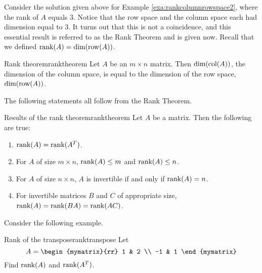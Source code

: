 Consider the solution given above for Example
\ref{exa:rankcolumnrowspace2}, where the rank of $A$ equals
$3$. Notice that the row space and the column space each had dimension
equal to $3$. It turns out that this is not a coincidence, and this
essential result is referred to as the Rank Theorem and is given
now. Recall that we defined $\mbox{rank}(A) = \mbox{dim}(\mbox{row}(A))$. 

\begin{theorem}{Rank theorem}{ranktheorem}
Let $A$ be an $m \times n$ matrix. Then $\mbox{dim}(\mbox{col} (A))$, the dimension of the column space, is equal to the dimension of the row space, $\mbox{dim}(\mbox{row}(A))$.
\end{theorem}

The following statements all follow from the Rank Theorem.

\begin{corollary}{Results of the rank theorem}{ranktheorem}
Let $A$ be a matrix. Then the following are true:
\begin{enumerate}
\item
 $\mbox{rank}(A) = \mbox{rank}(A^T)$.
\item
For $A$ of size $m \times n$, $\mbox{rank}(A) \leq m$ and $\mbox{rank}(A) \leq n$.
\item
For $A$ of size $n \times n$,  $A$ is invertible if and only if $\mbox{rank}(A) = n$.
\item
For invertible matrices $B$ and $C$ of appropriate size, 
$\mbox{rank}(A) = \mbox{rank}(BA) = \mbox{rank}(AC)$. 
\end{enumerate}
\end{corollary}

Consider the following example.

\begin{example}{Rank of the transpose}{ranktranspose}
Let \[
A = 
\begin{mymatrix}{rr}
1 & 2 \\
-1 & 1 
\end{mymatrix}
\]
Find $\mbox{rank}(A)$ and $\mbox{rank}(A^T)$.
\end{example}

